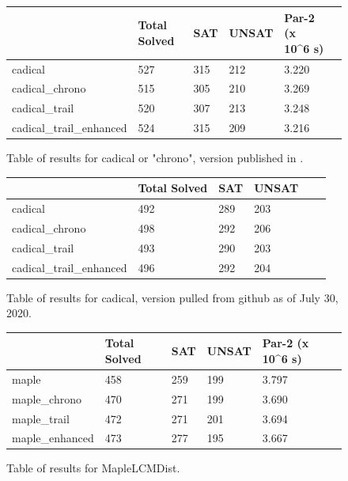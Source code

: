 \documentclass{article}
\begin{document}
\begin{figure}
\begin{tabular}{|l|l|l|l|l|l|}
\hline
                         & Total Solved & SAT & UNSAT & Par-2 (x 10\textasciicircum{}6 s) \\ \hline
cadical                  & 527          & 315 &  212  & 3.220                             \\ \hline
cadical\_chrono          & 515          & 305 &  210  & 3.269                             \\ \hline
cadical\_trail           & 520          & 307 &  213  & 3.248                             \\ \hline
cadical\_trail\_enhanced & 524          & 315 &  209  & 3.216                             \\ \hline
\end{tabular}
\caption{Table of results for cadical or "chrono", version published in \cite{DBLP:conf/sat/MohleB19}.}
\end{figure}

\begin{figure}
\begin{tabular}{|l|l|l|l|l|l|}
\hline
                         & Total Solved & SAT & UNSAT \\ \hline
cadical                  & 492          & 289 &  203  \\ \hline
cadical\_chrono          & 498          & 292 &  206  \\ \hline
cadical\_trail           & 493          & 290 &  203  \\ \hline
cadical\_trail\_enhanced & 496          & 292 &  204  \\ \hline
\end{tabular}
\caption{Table of results for cadical, version pulled from github as of July 30, 2020.}
\end{figure}

\begin{figure}
\begin{tabular}{|l|l|l|l|l|l|}
\hline
                & Total Solved & SAT & UNSAT & Par-2 (x 10\textasciicircum{}6 s) \\ \hline
maple           & 458          & 259 &  199  & 3.797                             \\ \hline
maple\_chrono   & 470          & 271 &  199  & 3.690                             \\ \hline
maple\_trail    & 472          & 271 &  201  & 3.694                             \\ \hline
maple\_enhanced & 473          & 277 &  195  & 3.667                             \\ \hline
\end{tabular}
\caption{Table of results for MapleLCMDist.}
\end{figure}
\clearpage
\end{document}
